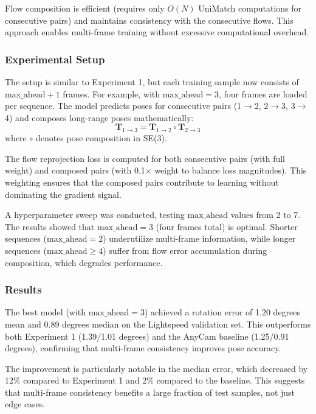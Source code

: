 Flow composition is efficient (requires only $O(N)$ UniMatch computations for consecutive pairs) and maintains consistency with the consecutive flows. This approach enables multi-frame training without excessive computational overhead.

\subsubsection{Experimental Setup}

The setup is similar to Experiment 1, but each training sample now consists of $\text{max\_ahead} + 1$ frames. For example, with $\text{max\_ahead} = 3$, four frames are loaded per sequence. The model predicts poses for consecutive pairs (1$\to$2, 2$\to$3, 3$\to$4) and composes long-range poses mathematically:
\begin{equation}
    \mathbf{T}_{1 \to 3} = \mathbf{T}_{1 \to 2} \circ \mathbf{T}_{2 \to 3}
\end{equation}
where $\circ$ denotes pose composition in SE(3).

The flow reprojection loss is computed for both consecutive pairs (with full weight) and composed pairs (with 0.1$\times$ weight to balance loss magnitudes). This weighting ensures that the composed pairs contribute to learning without dominating the gradient signal.

A hyperparameter sweep was conducted, testing $\text{max\_ahead}$ values from 2 to 7. The results showed that $\text{max\_ahead} = 3$ (four frames total) is optimal. Shorter sequences ($\text{max\_ahead} = 2$) underutilize multi-frame information, while longer sequences ($\text{max\_ahead} \geq 4$) suffer from flow error accumulation during composition, which degrades performance.

\subsubsection{Results}

The best model (with $\text{max\_ahead} = 3$) achieved a rotation error of 1.20 degrees mean and 0.89 degrees median on the Lightspeed validation set. This outperforms both Experiment 1 (1.39/1.01 degrees) and the AnyCam baseline (1.25/0.91 degrees), confirming that multi-frame consistency improves pose accuracy.

The improvement is particularly notable in the median error, which decreased by 12\% compared to Experiment 1 and 2\% compared to the baseline. This suggests that multi-frame consistency benefits a large fraction of test samples, not just edge cases.

